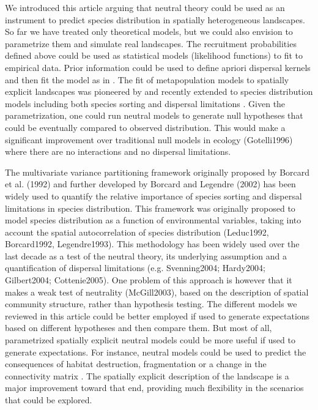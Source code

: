 \documentclass[12pt]{article}
\begin{document}
We introduced this article arguing that neutral theory could be used as an
instrument to predict species distribution in spatially heterogeneous
landscapes. So far we have treated only theoretical models, but we could also
envision to parametrize them and simulate real landscapes. The recruitment
probabilities defined above could be used as statistical models (likelihood
functions) to fit to empirical data. Prior information could be used to define
apriori dispersal kernels and then fit the model as in \textcite{Gravel2008}.
The fit of metapopulation models to spatially explicit landscapes was pioneered
by \textcite{Hanski1998} and recently extended to species distribution models
including both species sorting and dispersal limitations
\parencite{Boulangeat2012}. Given the parametrization, one could run neutral
models to generate null hypotheses that could be eventually compared to observed
distribution. This would make a significant improvement over traditional null
models in ecology (Gotelli1996) where there are no interactions and no dispersal
limitations.

The multivariate variance partitioning framework originally proposed by Borcard
et al. (1992) and further developed by Borcard and Legendre (2002) has been
widely used to quantify the relative importance of species sorting and dispersal
limitations in species distribution. This framework was originally proposed to
model species distribution as a function of environmental variables, taking into
account the spatial autocorrelation of species distribution (Leduc1992,
Borcard1992, Legendre1993). This methodology has been widely used over the last
decade as a test of the neutral theory, its underlying assumption and a
quantification of dispersal limitations (e.g. Svenning2004; Hardy2004;
Gilbert2004; Cottenie2005). One problem of this approach is however that it
makes a weak test of neutrality (McGill2003), based on the description of
spatial community structure, rather than hypothesis testing. The different
models we reviewed in this article could be better employed if used to generate
expectations based on different hypotheses and then compare them. But most of
all, parametrized spatially explicit neutral models could be more useful if
used to generate expectations. For instance, neutral models could be used to
predict the consequences of habitat destruction, fragmentation or a change in
the connectivity matrix \parencite{Hubbell2008}. The spatially explicit
description of the landscape is a major improvement toward that end, providing
much flexibility in the scenarios that could be explored.
\end{document}

